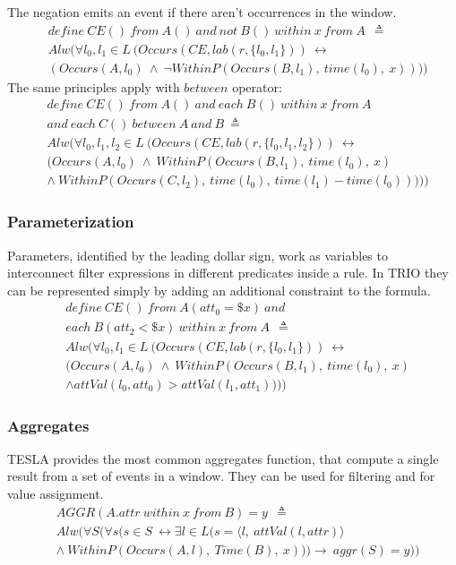 The negation emits an event if there aren't occurrences in the window.
\begin{align*}
&define\ CE()\ from\ A()\ and\ not\ B()\ within\ x\ from\ A\ \ \triangleq\\
&Alw(\forall l_0, l_1 \in L\ (Occurs(CE, lab(r, \{l_0, l_1\}))\ \leftrightarrow\\
&(Occurs(A, l_0)\ \wedge\ \neg WithinP(Occurs(B, l_1),\ time(l_0),\ x))))
\end{align*}
The same principles apply with $between$ operator:
\begin{align*}
&define\ CE()\ from\ A()\ and\ each\ B()\ within\ x\ from\ A\\
&and\ each\ C()\ between\ A\ and\ B\ \triangleq\\
&Alw(\forall l_0, l_1, l_2 \in L\ (Occurs(CE, lab(r, \{l_0, l_1, l_2\}))\ \leftrightarrow\\
&(Occurs(A, l_0)\ \wedge\ WithinP(Occurs(B, l_1),\ time(l_0),\ x)\\
&\wedge\ WithinP(Occurs(C, l_2),\ time(l_0),\ time(l_1) - time(l_0)))))
\end{align*}

\subsubsection{Parameterization}
Parameters, identified by the leading dollar sign, work as variables to interconnect filter expressions in different predicates inside a rule. In TRIO they can be represented simply by adding an additional constraint to the formula.
\begin{align*}
&define\ CE()\ from\ A(att_0 = \$x)\ and\\
&each\ B(att_2 < \$x)\ within\ x\ from\ A\ \ \triangleq\\
&Alw(\forall l_0, l_1 \in L\ (Occurs(CE, lab(r, \{l_0, l_1\}))\ \leftrightarrow\\
&(Occurs(A, l_0)\ \wedge\ WithinP(Occurs(B, l_1),\ time(l_0),\ x)\\
&\wedge attVal(l_0, att_0) > attVal(l_1, att_1))))
\end{align*}

\subsubsection{Aggregates}
TESLA provides the most common aggregates function, that compute a single result from a set of events in a window. They can be used for filtering and for value assignment.
\begin{align*}
&AGGR(A.attr\ within\ x\ from\ B) = y\ \ \triangleq\\
&Alw(\forall S (\forall s (s \in S\ \leftrightarrow \exists l \in
L (s = \langle l,\ attVal(l,attr) \rangle\\
&\wedge\ WithinP(Occurs(A,l),\ Time(B),\ x))) \rightarrow\ aggr(S)=y))
\end{align*}

